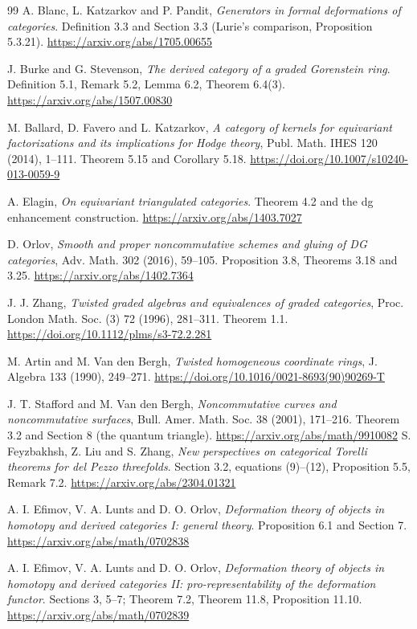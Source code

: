 \documentclass[a4paper,11pt]{ltjsarticle}
\theoremstyle{definition}
\begin{document}
\begin{thebibliography}{99}
A. Blanc, L. Katzarkov and P. Pandit,
\emph{Generators in formal deformations of categories}.
Definition 3.3 and Section 3.3 (Lurie's comparison, Proposition 5.3.21).
\url{https://arxiv.org/abs/1705.00655}

J. Burke and G. Stevenson,
\emph{The derived category of a graded Gorenstein ring}.
Definition 5.1, Remark 5.2, Lemma 6.2, Theorem 6.4(3).
\url{https://arxiv.org/abs/1507.00830}

M. Ballard, D. Favero and L. Katzarkov,
\emph{A category of kernels for equivariant factorizations and its implications for Hodge theory},
Publ. Math. IHES 120 (2014), 1--111.
Theorem 5.15 and Corollary 5.18.
\url{https://doi.org/10.1007/s10240-013-0059-9}

A. Elagin,
\emph{On equivariant triangulated categories}.
Theorem 4.2 and the dg enhancement construction.
\url{https://arxiv.org/abs/1403.7027}

D. Orlov,
\emph{Smooth and proper noncommutative schemes and gluing of DG categories},
Adv. Math. 302 (2016), 59--105.
Proposition 3.8, Theorems 3.18 and 3.25.
\url{https://arxiv.org/abs/1402.7364}

J. J. Zhang,
\emph{Twisted graded algebras and equivalences of graded categories},
Proc. London Math. Soc. (3) 72 (1996), 281--311.
Theorem 1.1.
\url{https://doi.org/10.1112/plms/s3-72.2.281}

M. Artin and M. Van den Bergh,
\emph{Twisted homogeneous coordinate rings},
J. Algebra 133 (1990), 249--271.
\url{https://doi.org/10.1016/0021-8693(90)90269-T}

J. T. Stafford and M. Van den Bergh,
\emph{Noncommutative curves and noncommutative surfaces},
Bull. Amer. Math. Soc. 38 (2001), 171--216.
Theorem 3.2 and Section 8 (the quantum triangle).
\url{https://arxiv.org/abs/math/9910082}
S. Feyzbakhsh, Z. Liu and S. Zhang,
\emph{New perspectives on categorical Torelli theorems for del Pezzo threefolds}.
Section 3.2, equations (9)--(12), Proposition 5.5, Remark 7.2.
\url{https://arxiv.org/abs/2304.01321}

A. I. Efimov, V. A. Lunts and D. O. Orlov,
\emph{Deformation theory of objects in homotopy and derived categories I: general theory}.
Proposition 6.1 and Section 7.
\url{https://arxiv.org/abs/math/0702838}

A. I. Efimov, V. A. Lunts and D. O. Orlov,
\emph{Deformation theory of objects in homotopy and derived categories II:
pro-representability of the deformation functor}.
Sections 3, 5--7; Theorem 7.2, Theorem 11.8, Proposition 11.10.
\url{https://arxiv.org/abs/math/0702839}


\end{thebibliography}
\end{document}
